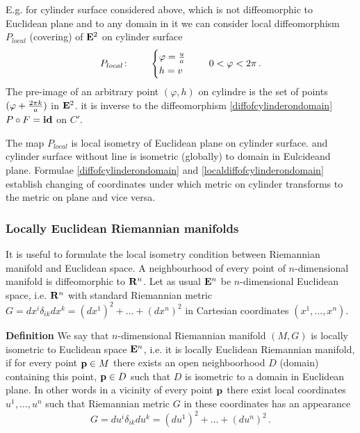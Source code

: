 \documentclass[12pt]{article}
\theoremstyle{theorem}
\numberwithin{equation}{section}
\begin{document}
{{E.g. for cylinder surface considered above, which
is not diffeomorphic to Euclidean plane
and to any domain in it
we can consider
local diffeomorphism $P_{local}$
(covering) of ${\bf E}^2$ on cylinder surface
         \begin{equation}\label{localdiffofcylinderondomain}
        P_{local}\colon\qquad
        \begin{cases}
          \varphi={u\over a}\cr
           h=v\cr
          \end{cases}\,\quad 0<\varphi < 2\pi\,.
           \end{equation}
   The pre-image of an arbitrary point $(\varphi,h)$ on cylindre
is the set of points $(\varphi+{2\pi k\over a})$ in ${\bf E}^2$.
it is inverse to the diffeomorphism \eqref{diffofcylinderondomain}
$P\circ F={\bf id}$ on $C'$.

 The map $P_{local}$
is local isometry of Euclidean plane on cylinder surface. and
cylinder surface without
line is isometric (globally) to domain in Eulcideand plane.
Formulae \eqref{diffofcylinderondomain} and
\eqref{localdiffofcylinderondomain} establish changing of coordinates
under which metric on cylinder transforms to the metric on
plane and vice versa.
}




\subsubsection{Locally Euclidean Riemannian
 manifolds }
It is useful to formulate the  local isometry condition between
Riemannian manifold and Euclidean space.
A neighbourhood of every point of $n$-dimensional
 manifold is diffeomorphic to ${\bf R}^n$.
Let as usual ${\bf E}^n$ be $n$-dimensional
Euclidean space, i.e. ${\bf R}^n$  with standard Riemannian metric
$G=dx^i\delta_{ik}dx^k=(dx^1)^2+\dots+(dx^n)^2$
in Cartesian coordinates $(x^1,\dots,x^n)$.

{\bf Definition} We say that $n$-dimensional Riemannian manifold
$(M,G)$ is locally isometric to Euclidean space ${\bf E}^n$,
i.e.  it is locally Euclidean Riemannian manifold,
if for every point ${\bf p}\in M$ there exists an  open
neighboorhood $D$ (domain) containing this point, ${\bf p}\in D$
such that $D$ is isometric to a domain in Euclidean plane. In other words
in a vicinity of every point ${\bf p}$ there exist local coordinates
$u^1,\dots,u^n$ such that Riemannian metric $G$ in
these coordinates has an appearance
            \begin{equation}\label{defofisometrytoEuclid}
           G=du^i\delta_{ik}du^k=(du^1)^2+\dots+(du^n)^2\,.
             \end{equation}

}
\end{document}
